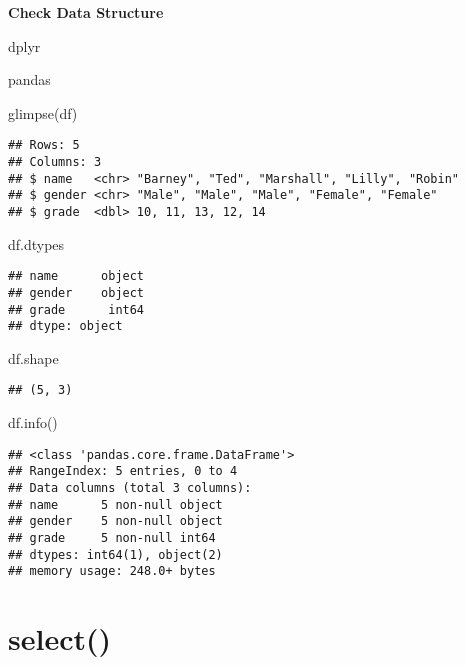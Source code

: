 \documentclass[
]{book}
\newenvironment{Shaded}{\begin{snugshade}}{\end{snugshade}}
\newcommand{\FunctionTok}[1]{\textcolor[rgb]{0.00,0.00,0.00}{#1}}
\newcommand{\NormalTok}[1]{#1}
\begin{document}
{\textbf{Check Data Structure}}

dplyr

pandas

\begin{Shaded}
\begin{Highlighting}[]
\FunctionTok{glimpse}\NormalTok{(df)}
\end{Highlighting}
\end{Shaded}

\begin{verbatim}
## Rows: 5
## Columns: 3
## $ name   <chr> "Barney", "Ted", "Marshall", "Lilly", "Robin"
## $ gender <chr> "Male", "Male", "Male", "Female", "Female"
## $ grade  <dbl> 10, 11, 13, 12, 14
\end{verbatim}

\begin{Shaded}
\begin{Highlighting}[]
\NormalTok{df.dtypes}
\end{Highlighting}
\end{Shaded}

\begin{verbatim}
## name      object
## gender    object
## grade      int64
## dtype: object
\end{verbatim}

\begin{Shaded}
\begin{Highlighting}[]
\NormalTok{df.shape}
\end{Highlighting}
\end{Shaded}

\begin{verbatim}
## (5, 3)
\end{verbatim}

\begin{Shaded}
\begin{Highlighting}[]
\NormalTok{df.info()}
\end{Highlighting}
\end{Shaded}

\begin{verbatim}
## <class 'pandas.core.frame.DataFrame'>
## RangeIndex: 5 entries, 0 to 4
## Data columns (total 3 columns):
## name      5 non-null object
## gender    5 non-null object
## grade     5 non-null int64
## dtypes: int64(1), object(2)
## memory usage: 248.0+ bytes
\end{verbatim}

\hypertarget{select}{%
\section{select()}\label{select}}
\end{document}
